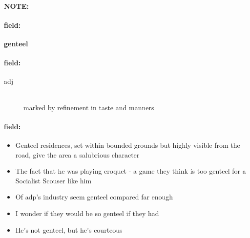 \documentclass[12pt]{article}
\newenvironment{note}{\paragraph{NOTE:}}{}
\newenvironment{field}{\paragraph{field:}}{}
\begin{document}
\begin{note}
\begin{field}
\textbf{\large genteel}
\end{field}


\begin{field}
\begin{description}
\item[adj] \hfill \\ 
marked by refinement in taste and manners

\end{description}
\end{field}

\begin{field}
\begin{itemize}
\item Genteel residences, set within bounded grounds but highly visible from the road, give the area a salubrious character
\item The fact that he was playing croquet - a game they think is too genteel for a Socialist Scouser like him
\item Of adp's industry seem genteel compared far enough
\item I wonder if they would be so genteel if they had
\item He's not genteel, but he's courteous
\end{itemize}
\end{field}
\end{note}
\end{document}
